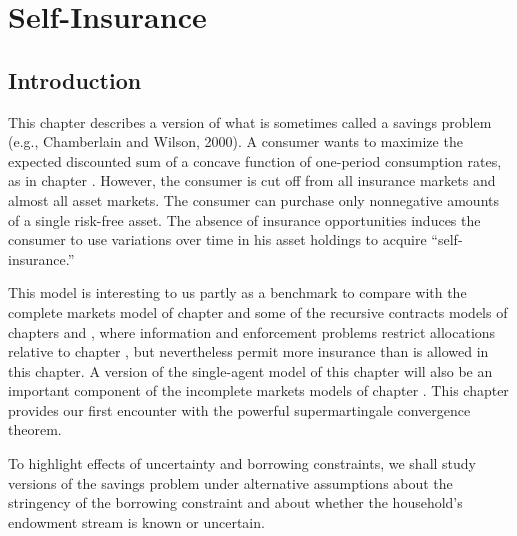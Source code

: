

%




\def\toone{{t+1}}
\def\ttwo{{t+2}}
\def\tthree{{t+3}}
\def\Tone{{T+1}}
\def\TTT{{T-1}}
\def\rtr{{\rm tr}}
\chapter{Self-Insurance\label{selfinsure}}

\section{Introduction}

  This chapter describes a version of what is sometimes
called a savings problem (e.g., Chamberlain and Wilson, 2000).
A consumer wants to maximize the expected discounted sum of a
concave function of one-period consumption rates, as in
chapter .  However, the consumer is cut off from
all insurance markets and almost all asset markets.  The
consumer can  purchase only nonnegative amounts of a single
risk-free asset.   The absence of insurance opportunities
induces the consumer to use variations over time in his asset holdings to acquire
``self-insurance.''
   

  This model is interesting to us partly as a benchmark to compare
with the complete markets model of  chapter  and some of the
recursive contracts models of chapters  and , where
information and enforcement problems restrict allocations relative to
chapter , but nevertheless permit more insurance than is
allowed in this chapter.  A version of the single-agent model
of this chapter will also be an  important component of the incomplete
markets models  of chapter .  This chapter
provides our first encounter with the powerful supermartingale convergence theorem.

To highlight  effects of uncertainty and borrowing constraints, we shall
study versions of the savings problem under alternative assumptions about the
stringency of the borrowing constraint and  about
whether the household's endowment stream is known or uncertain.

